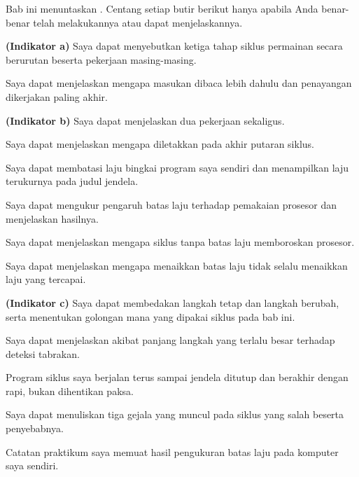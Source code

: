 
Bab ini menuntaskan . Centang setiap butir berikut hanya apabila
Anda benar-benar telah melakukannya atau dapat menjelaskannya.

\begin{checklistbox}
\begin{checklist}
  \item {\bfseries (Indikator a)} Saya dapat menyebutkan ketiga tahap siklus
        permainan secara berurutan beserta pekerjaan masing-masing.
  \item Saya dapat menjelaskan mengapa masukan dibaca lebih dahulu dan
        penayangan dikerjakan paling akhir.
  \item {\bfseries (Indikator b)} Saya dapat menjelaskan dua pekerjaan
         sekaligus.
  \item Saya dapat menjelaskan mengapa  diletakkan pada
        akhir putaran siklus.
  \item Saya dapat membatasi laju bingkai program saya sendiri dan
        menampilkan laju terukurnya pada judul jendela.
  \item Saya dapat mengukur pengaruh batas laju terhadap pemakaian prosesor
        dan menjelaskan hasilnya.
  \item Saya dapat menjelaskan mengapa siklus tanpa batas laju memboroskan
        prosesor.
  \item Saya dapat menjelaskan mengapa menaikkan batas laju tidak selalu
        menaikkan laju yang tercapai.
  \item {\bfseries (Indikator c)} Saya dapat membedakan langkah tetap dan
        langkah berubah, serta menentukan golongan mana yang dipakai siklus
        pada bab ini.
  \item Saya dapat menjelaskan akibat panjang langkah yang terlalu besar
        terhadap deteksi tabrakan.
  \item Program siklus saya berjalan terus sampai jendela ditutup dan berakhir
        dengan rapi, bukan dihentikan paksa.
  \item Saya dapat menuliskan tiga gejala yang muncul pada siklus yang salah
        beserta penyebabnya.
  \item Catatan praktikum saya memuat hasil pengukuran batas laju pada komputer
        saya sendiri.
\end{checklist}
\end{checklistbox}
